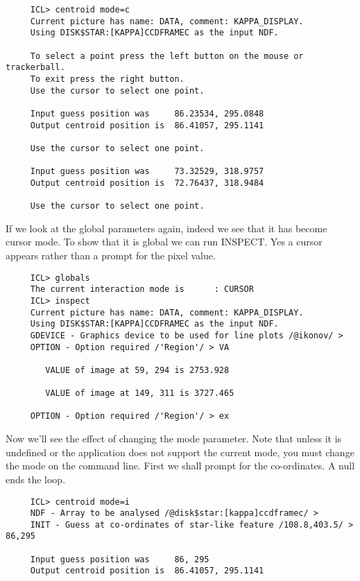 {\small
\begin{verbatim}
     ICL> centroid mode=c
     Current picture has name: DATA, comment: KAPPA_DISPLAY.
     Using DISK$STAR:[KAPPA]CCDFRAMEC as the input NDF.
     
     To select a point press the left button on the mouse or trackerball.
     To exit press the right button.
     Use the cursor to select one point.
 
     Input guess position was     86.23534, 295.0848
     Output centroid position is  86.41057, 295.1141
 
     Use the cursor to select one point.
 
     Input guess position was     73.32529, 318.9757
     Output centroid position is  72.76437, 318.9484
 
     Use the cursor to select one point.
\end{verbatim}
\normalsize
If we look at the global parameters again, indeed we see that it has
become cursor mode.  To show that it is global we can run INSPECT.
Yes a cursor appears rather than a prompt for the pixel value.

\small
\begin{verbatim}
     ICL> globals
     The current interaction mode is      : CURSOR
     ICL> inspect
     Current picture has name: DATA, comment: KAPPA_DISPLAY.
     Using DISK$STAR:[KAPPA]CCDFRAMEC as the input NDF.
     GDEVICE - Graphics device to be used for line plots /@ikonov/ >
     OPTION - Option required /'Region'/ > VA
 
        VALUE of image at 59, 294 is 2753.928
       
        VALUE of image at 149, 311 is 3727.465
 
     OPTION - Option required /'Region'/ > ex
\end{verbatim}
\normalsize
Now we'll see the effect of changing the mode parameter. Note that
unless it is undefined or the application does not support the current
mode, you must change the mode on the command line.  First we shall
prompt for the co-ordinates.  A null ends the loop.

\small
\begin{verbatim}
     ICL> centroid mode=i
     NDF - Array to be analysed /@disk$star:[kappa]ccdframec/ >
     INIT - Guess at co-ordinates of star-like feature /108.8,403.5/ > 86,295

     Input guess position was     86, 295
     Output centroid position is  86.41057, 295.1141
     

\end{verbatim}}
